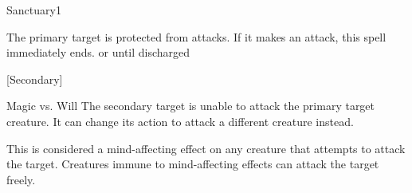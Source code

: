 \begin{spellsection}{Sanctuary}{1}
\begin{spellheader}
\end{spellheader}
\begin{spellcontent}
    \begin{spelltargetinginfo}
    \end{spelltargetinginfo}
    \begin{spelleffects}
        \spelleffect The primary target is protected from attacks. If it makes an attack, this spell immediately ends.
        \spelldur \durshort or until discharged
    \end{spelleffects}
\end{spellcontent}
\begin{spellsubcontent}
    \begin{spelltargetinginfo}
        [Secondary]
    \end{spelltargetinginfo}
    \begin{spelleffects}
        \begin{spellattack}{Magic vs. Will}
            \spellsuccess The secondary target is unable to attack the primary target creature. It can change its action to attack a different creature instead.
        \end{spellattack}
    \end{spelleffects}
\end{spellsubcontent}
\begin{spellfooter}
    \spellnotes This is considered a mind-affecting effect on any creature that attempts to attack the target. Creatures immune to mind-affecting effects can attack the target freely.
\end{spellfooter}
\end{spellsection}

